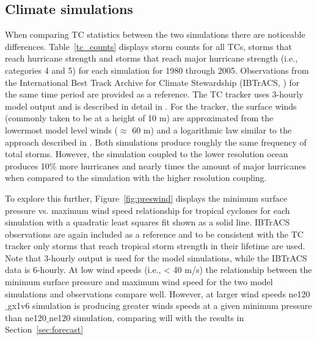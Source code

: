 \documentclass[draft,ms]{AGUTeX}
\begin{document}
\begin{article}
\subsection{Climate simulations}
\label{sec:climate}
When comparing TC statistics between the two simulations there are noticeable differences.  Table~\ref{tc_counts} displays storm counts for all TCs, storms that reach hurricane strength and storms that reach major hurricane strength (i.e., categories 4 and 5) for each simulation for 1980 through 2005. Observations from the International Best Track Archive for Climate Stewardship (IBTrACS, \citet{Knapp2010}) for the same time period are provided as a reference. The TC tracker uses 3-hourly model output and is described in detail in \citet{Zhao2009}.  For the tracker, the surface winds (commonly taken to be at a height of 10 m) are approximated from the lowermost model level winds ($\approx$ 60 m) and a logarithmic law similar to the approach described in \citet{Zarzycki2014AMIPTCs}.  Both simulations produce roughly the same frequency of total storms.  However, the simulation coupled to the lower resolution ocean produces 10$\%$ more hurricanes and nearly times the amount of major hurricanes when compared to the simulation with the higher resolution coupling.

To explore this further, Figure~\ref{fig:preswind} displays the minimum surface pressure vs. maximum wind speed relationship for tropical cyclones for each simulation with a quadratic least squares fit shown as a solid line. IBTrACS observations are again included as a reference and to be consistent with the TC tracker only storms that reach tropical storm strength in their lifetime are used. Note that 3-hourly output is used for the model simulations, while the IBTrACS data is 6-hourly.  At low wind speeds (i.e., < 40 m/s) the relationship between the minimum surface pressure and maximum wind speed for the two model simulations and observations compare well.  However, at larger wind speeds ne120$\_$gx1v6 simulation is producing greater winds speeds at a given minimum pressure than ne120$\_$ne120 simulation, comparing will with the results in Section~\ref{sec:forecast}


\end{article}
\end{document}

